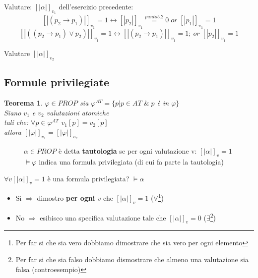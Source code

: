 \documentclass{article}
\newtheorem{theorem}{Teorema}
\theoremstyle{break}
\theoremstyle{break}
\theoremstyle{break}
\theoremstyle{break}
\begin{document}
\begin{exercise}
	Valutare: \( [|\alpha|]_{v_1} \) dell'esercizio precedente:
	\[ [|(p_2 \to p_1)|]_{v_1}=1 \leftrightarrow [|p_2|]_{v_1}\stackrel{punto 5.2}{=} 0\; or\; [|p_1|]_{v_1}=1 \]
	\[ [|((p_2 \to p_1)\vee p_2)|]_{v_1} = 1 \leftrightarrow [|(p_2 \to p_1)|]_{v_1}=1;\ or\; [|p_2|]_{v_1}=1 \]
\end{exercise}

\begin{exercise}[A casa]
	Valutare \( [|\alpha|]_{v_2} \)
\end{exercise}


\subsection{Formule privilegiate}
\begin{theorem}
	\( \varphi \in PROP \) sia \( \varphi^{AT} = \{ p | p \in AT\; \&\; p \) è in \( \varphi\} \) \\
	Siano \( v_1 \) e \( v_2 \) valutazioni atomiche\\
	tali che: \( \forall p \in \varphi^{AT} \) \( v_1[p]=v_2[p] \) \\
	allora \( [|\varphi|]_{v_1} = [|\varphi|]_{v_2} \)
\end{theorem}

\begin{figure}[H]
    \begin{definition}
        \( \alpha \in PROP \) è detta \textbf{tautologia} se per ogni valutazione
        v: \( [|\alpha|]_v = 1 \)\\
        \(
        \models \varphi
        \) indica una formula privilegiata (di cui fa parte la tautologia)
    \end{definition}
\end{figure}

\( \forall v [|\alpha|]_v = 1 \) è una formula privilegiata? \( \models \alpha \)
\begin{itemize}
	\item Sì \( \Rightarrow \) dimostro \textbf{per ogni \( v \)} che \( [|\alpha|]_v = 1\) (\( \forall  \)\footnote{Per far si che sia vero
		      dobbiamo dimostrare che sia vero per ogni elemento})
	\item No \( \Rightarrow \) esibisco una specifica valutazione
	      tale che \( [|\alpha|]_v= 0 \) (\( \exists  \)\footnote{Per far si che sia falso
		      dobbiamo dismostrare che almeno una valutazione sia falsa (controesempio)})
\end{itemize}
\end{document}
